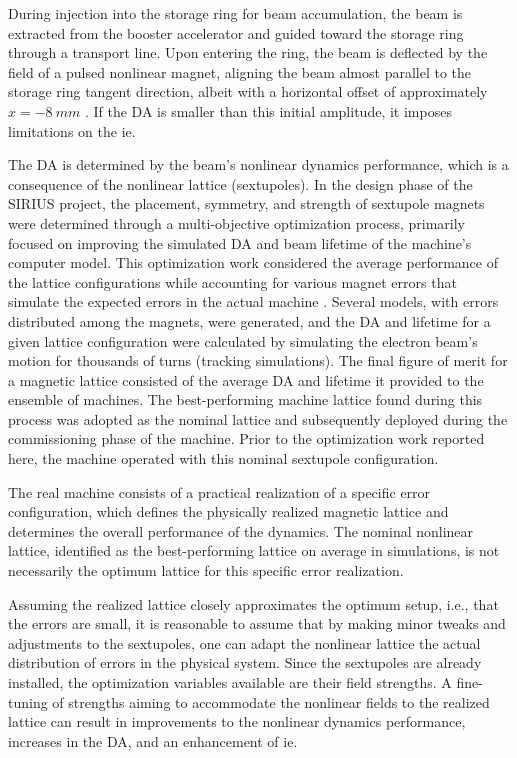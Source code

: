 During injection into the storage ring for beam accumulation, the beam is extracted from the booster accelerator and guided toward the storage ring through a transport line. Upon entering the ring, the beam is deflected by the field of a pulsed nonlinear magnet, aligning the beam almost parallel to the storage ring tangent direction, albeit with a horizontal offset of approximately $x=-8~\unit{mm}$ \cite{liu_injection_2016}. If the \gls*{DA}  is smaller than this initial amplitude, it imposes limitations on the \gls*{ie}.

The \gls*{DA} is determined by the beam's nonlinear dynamics performance, which is a consequence of the nonlinear lattice (sextupoles). In the design phase of the SIRIUS project, the placement, symmetry, and strength of sextupole magnets were determined through a multi-objective optimization process, primarily focused on improving the simulated \gls*{DA} and beam lifetime of the machine's computer model\cite{de_sa_optimization_2016, dester_energy_2017}. This optimization work considered the average performance of the lattice configurations while accounting for various magnet errors that simulate the expected errors in the actual machine \cite{de_sa_optimization_2016}. Several models, with errors distributed among the magnets, were generated, and the \gls*{DA} and lifetime for a given lattice configuration were calculated by simulating the electron beam's motion for thousands of turns (tracking simulations). The final figure of merit for a magnetic lattice consisted of the average \gls*{DA} and lifetime it provided to the ensemble of machines. The best-performing machine lattice found during this process was adopted as the nominal lattice and subsequently deployed during the commissioning phase of the machine. Prior to the optimization work reported here, the machine operated with this nominal sextupole configuration.

The real machine consists of a practical realization of a specific error configuration, which defines the physically realized magnetic lattice and determines the overall performance of the dynamics. The nominal nonlinear lattice, identified as the best-performing lattice on average in simulations, is not necessarily the optimum lattice for this specific error realization.

Assuming the realized lattice closely approximates the optimum setup, i.e., that the errors are small, it is reasonable to assume that by making minor tweaks and adjustments to the sextupoles, one can adapt the nonlinear lattice the actual distribution of errors in the physical system. Since the sextupoles are already installed, the optimization variables available are their field strengths. A fine-tuning of strengths aiming to accommodate the nonlinear fields to the realized lattice can result in improvements to the nonlinear dynamics performance, increases in the \gls*{DA}, and an enhancement of \gls*{ie}.

